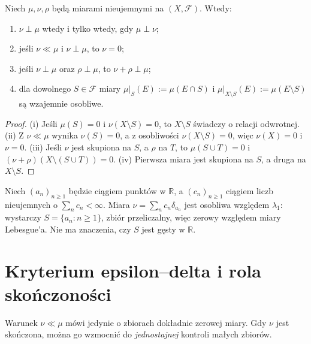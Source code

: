 \begin{lemat}
\label{lem:singularity-17}
Niech $\mu,\nu,\rho$ będą miarami nieujemnymi na $(X,\mathcal F)$.
Wtedy:
\begin{enumerate}[label=\textup{(\roman*)}]
\item $\nu\perp\mu$ wtedy i tylko wtedy, gdy $\mu\perp\nu$;
\item jeśli $\nu\ll\mu$ i $\nu\perp\mu$, to $\nu=0$;
\item jeśli $\nu\perp\mu$ oraz $\rho\perp\mu$, to
$\nu+\rho\perp\mu$;
\item dla dowolnego $S\in\mathcal F$ miary
$\mu|_S(E):=\mu(E\cap S)$ i
$\mu|_{X\setminus S}(E):=\mu(E\setminus S)$ są wzajemnie osobliwe.
\end{enumerate}
\end{lemat}
\begin{proof}
(i) Jeśli $\mu(S)=0$ i $\nu(X\setminus S)=0$, to
$X\setminus S$ świadczy o relacji odwrotnej.
(ii) Z $\nu\ll\mu$ wynika $\nu(S)=0$, a z osobliwości
$\nu(X\setminus S)=0$, więc $\nu(X)=0$ i $\nu=0$.
(iii) Jeśli $\nu$ jest skupiona na $S$, a $\rho$ na $T$,
to $\mu(S\cup T)=0$ i $(\nu+\rho)(X\setminus(S\cup T))=0$.
(iv) Pierwsza miara jest skupiona na $S$, a druga na $X\setminus S$.
\end{proof}

\begin{przyklad}
Niech $(a_n)_{n\ge1}$ będzie ciągiem punktów w $\mathbb R$, a
$(c_n)_{n\ge1}$ ciągiem liczb nieujemnych o
$\sum_nc_n<\infty$. Miara $\nu=\sum_nc_n\delta_{a_n}$
jest osobliwa względem $\lambda_1$: wystarczy
$S=\{a_n:n\ge1\}$, zbiór przeliczalny, więc zerowy
względem miary Lebesgue'a. Nie ma znaczenia, czy $S$ jest
gęsty w $\mathbb R$.
\end{przyklad}

\section{Kryterium epsilon--delta i rola skończoności}
Warunek $\nu\ll\mu$ mówi jedynie o zbiorach dokładnie zerowej
miary. Gdy $\nu$ jest skończona, można go wzmocnić do
\emph{jednostajnej} kontroli małych zbiorów.

